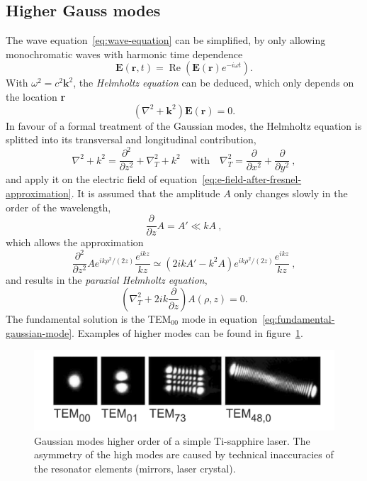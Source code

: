 \subsection{Higher Gauss modes}
The wave equation~\eqref{eq:wave-equation} can be simplified, by only allowing monochromatic waves with harmonic time dependence
\begin{equation}
\mathbf{E}(\mathbf{r},t) = \operatorname{Re}\left(\mathbf{E}(\mathbf{r})e^{-i\omega t}\right).
\end{equation}
With $\omega^2=c^2\mathbf{k}^2$, the \textit{Helmholtz equation} can be deduced, which only depends on the location \textbf{r}
\begin{equation}
\left(\nabla^2+\mathbf{k}^2\right)\mathbf{E}(\mathbf{r})=0.
\end{equation}
In favour of a formal treatment of the Gaussian modes, the Helmholtz equation is splitted into its transversal and longitudinal contribution,
\begin{equation}
\nabla^2+k^2=\frac{\partial^2}{\partial z^2} + \nabla_T^2+k^2
\quad\mathrm{with}\quad 
\nabla_T^2=\frac{\partial}{\partial x^2}+\frac{\partial}{\partial y^2} \ ,
\end{equation}
and apply it on the electric field of equation~\eqref{eq:e-field-after-fresnel-approximation}.
It is assumed that the amplitude $A$ only changes slowly in the order of the wavelength,
\begin{equation}
\frac{\partial}{\partial z} A = A' \ll kA \ ,
\end{equation}
which allows the approximation
\begin{equation}
\frac{\partial^2}{\partial z^2} A e^{ik\rho^2 /(2z)} \frac{e^{ikz}}{kz} \simeq (2ikA'-k^2A)e^{ik\rho^2/(2z)}\frac{e^{ikz}}{kz} \ ,
\end{equation}
and results in the \textit{paraxial Helmholtz equation},
\begin{equation}
\left(\nabla_T^2+2ik\frac{\partial}{\partial z}\right)A(\rho, z) = 0.
\end{equation}
The fundamental solution is the TEM$_{00}$ mode in equation~\eqref{eq:fundamental-gaussian-mode}. Examples of higher modes can be found in figure~\ref{fig:gauss-modes-higher-order}.
\begin{figure}[H]
	\centering
	\includegraphics[width=0.9\linewidth]{figures/fabry-perot/gauss-modes-higher-order}
	\caption[Gaussian modes higher order of a simple Ti-sapphire laser]{Gaussian modes higher order of a simple Ti-sapphire laser.
	The asymmetry of the high modes are caused by technical inaccuracies of the resonator elements (mirrors, laser crystal).}
	\label{fig:gauss-modes-higher-order}
\end{figure}

